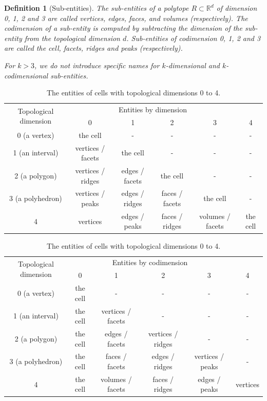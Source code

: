 \documentclass[sn-mathphys-num]{sn-jnl}%
\theoremstyle{thmstyleone}%
\newcommand{\refel}{R}
\theoremstyle{thmstyletwo}%
\theoremstyle{thmstylethree}%
\newtheorem{definition}{Definition}%
\begin{document}
\begin{definition}[Sub-entities]\label{def:sub-entities}
The sub-entities of a polytope $\refel\subset\mathbb{R}^d$
of dimension 0, 1, 2 and 3 are called
vertices, edges, faces, and volumes (respectively).
The \emph{codimension} of a sub-entity is computed by subtracting the dimension of the sub-entity from the topological dimension $d$.
Sub-entities of codimension 0, 1, 2 and 3 are called \emph{the cell}, \emph{facets}, \emph{ridges} and \emph{peaks} (respectively).

For $k>3$, we do not introduce specific names for $k$-dimensional and $k$-codimensional sub-entities.
\end{definition}

\begin{table}
\renewcommand{\arraystretch}{1.2}
\begin{tabular}{c|ccccc}
\multirow{2}{20mm}{\centering Topological dimension}&
\multicolumn{4}{c}{Entities by dimension}\\
&0&1&2&3&4\\\hline
0 \footnotesize(a vertex)
&the cell&-&-&-&-\\
1 \footnotesize(an interval)
&vertices / facets&the cell&-&-&-\\
2 \footnotesize(a polygon)
&vertices / ridges&edges / facets&the cell&-&-\\
3 \footnotesize(a polyhedron)
&vertices / peaks&edges / ridges&faces / facets&the cell&-\\
4
&vertices&edges / peaks&faces / ridges&volumes / facets&the cell\\
\end{tabular}

\vspace{5mm}

\begin{tabular}{c|ccccc}
\multirow{2}{20mm}{\centering Topological dimension}&
\multicolumn{4}{c}{Entities by codimension}\\
&0&1&2&3&4\\\hline
0 \footnotesize(a vertex)
&the cell&-&-&-&-\\
1 \footnotesize(an interval)
&the cell&vertices / facets&-&-&-\\
2 \footnotesize(a polygon)
&the cell&edges / facets&vertices / ridges&-&-\\
3 \footnotesize(a polyhedron)
&the cell&faces / facets&edges / ridges&vertices / peaks&-\\
4
&the cell&volumes / facets&faces / ridges&edges / peaks&vertices\\
\end{tabular}
\vspace{2mm}
\caption{The entities of cells with topological dimensions 0 to 4.}
\label{table:entities}
\end{table}
\end{document}
